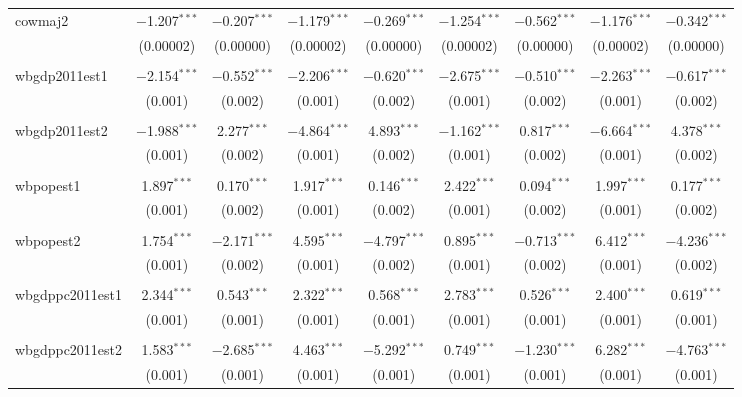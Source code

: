 \begin{table}[!htbp]
\begin{tabular}{@{\extracolsep{5pt}}lcccccccc}
 cowmaj2 & $-$1.207$^{***}$ & $-$0.207$^{***}$ & $-$1.179$^{***}$ & $-$0.269$^{***}$ & $-$1.254$^{***}$ & $-$0.562$^{***}$ & $-$1.176$^{***}$ & $-$0.342$^{***}$ \\ 
  & (0.00002) & (0.00000) & (0.00002) & (0.00000) & (0.00002) & (0.00000) & (0.00002) & (0.00000) \\ 
  & & & & & & & & \\ 
 wbgdp2011est1 & $-$2.154$^{***}$ & $-$0.552$^{***}$ & $-$2.206$^{***}$ & $-$0.620$^{***}$ & $-$2.675$^{***}$ & $-$0.510$^{***}$ & $-$2.263$^{***}$ & $-$0.617$^{***}$ \\ 
  & (0.001) & (0.002) & (0.001) & (0.002) & (0.001) & (0.002) & (0.001) & (0.002) \\ 
  & & & & & & & & \\ 
 wbgdp2011est2 & $-$1.988$^{***}$ & 2.277$^{***}$ & $-$4.864$^{***}$ & 4.893$^{***}$ & $-$1.162$^{***}$ & 0.817$^{***}$ & $-$6.664$^{***}$ & 4.378$^{***}$ \\ 
  & (0.001) & (0.002) & (0.001) & (0.002) & (0.001) & (0.002) & (0.001) & (0.002) \\ 
  & & & & & & & & \\ 
 wbpopest1 & 1.897$^{***}$ & 0.170$^{***}$ & 1.917$^{***}$ & 0.146$^{***}$ & 2.422$^{***}$ & 0.094$^{***}$ & 1.997$^{***}$ & 0.177$^{***}$ \\ 
  & (0.001) & (0.002) & (0.001) & (0.002) & (0.001) & (0.002) & (0.001) & (0.002) \\ 
  & & & & & & & & \\ 
 wbpopest2 & 1.754$^{***}$ & $-$2.171$^{***}$ & 4.595$^{***}$ & $-$4.797$^{***}$ & 0.895$^{***}$ & $-$0.713$^{***}$ & 6.412$^{***}$ & $-$4.236$^{***}$ \\ 
  & (0.001) & (0.002) & (0.001) & (0.002) & (0.001) & (0.002) & (0.001) & (0.002) \\ 
  & & & & & & & & \\ 
 wbgdppc2011est1 & 2.344$^{***}$ & 0.543$^{***}$ & 2.322$^{***}$ & 0.568$^{***}$ & 2.783$^{***}$ & 0.526$^{***}$ & 2.400$^{***}$ & 0.619$^{***}$ \\ 
  & (0.001) & (0.001) & (0.001) & (0.001) & (0.001) & (0.001) & (0.001) & (0.001) \\ 
  & & & & & & & & \\ 
 wbgdppc2011est2 & 1.583$^{***}$ & $-$2.685$^{***}$ & 4.463$^{***}$ & $-$5.292$^{***}$ & 0.749$^{***}$ & $-$1.230$^{***}$ & 6.282$^{***}$ & $-$4.763$^{***}$ \\ 
  & (0.001) & (0.001) & (0.001) & (0.001) & (0.001) & (0.001) & (0.001) & (0.001) \\ 

\end{tabular}
\end{table}
